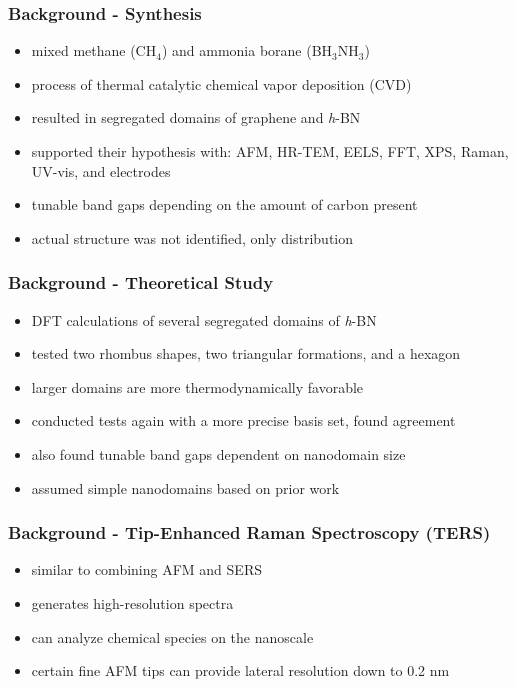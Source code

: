 \documentclass{beamer}
\newcommand{\sub}[1]{\ensuremath{_{\textrm{#1}}}}
\begin{document}
\begin{frame}
  \frametitle{Background - Synthesis\cite{synth}}
  \begin{itemize}
    \item mixed methane (CH\sub{4}) and ammonia borane (BH\sub{3}NH\sub{3})
    \item process of thermal catalytic chemical vapor deposition (CVD)
    \item resulted in segregated domains of graphene and \textit{h}-BN
    \item supported their hypothesis with: AFM, HR-TEM, EELS, FFT, XPS, Raman, UV-vis, and electrodes
    \item tunable band gaps depending on the amount of carbon present
    \item actual structure was not identified, only distribution
  \end{itemize}
\end{frame}

\begin{frame}
  \frametitle{Background - Theoretical Study\cite{main}}
  \begin{itemize}
    \item DFT calculations of several segregated domains of \textit{h}-BN
    \item tested two rhombus shapes, two triangular formations, and a hexagon
    \item larger domains are more thermodynamically favorable
    \item conducted tests again with a more precise basis set, found agreement
    \item also found tunable band gaps dependent on nanodomain size
    \item assumed simple nanodomains based on prior work
  \end{itemize}
\end{frame}

\begin{frame}
  \frametitle{Background - Tip-Enhanced Raman Spectroscopy (TERS)\cite{ters}}
  \begin{itemize}
    \item similar to combining AFM and SERS
    \item generates high-resolution spectra
    \item can analyze chemical species on the nanoscale
    \item certain fine AFM tips can provide lateral resolution down to 0.2 nm
  \end{itemize}
\end{frame}
\end{document}
